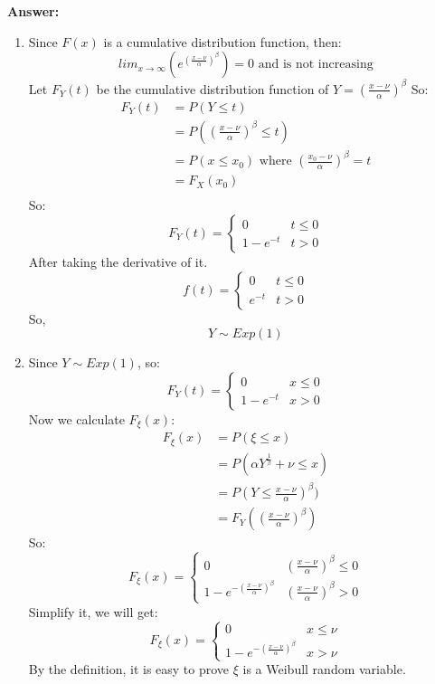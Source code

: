 \documentclass[hidelinks]{article}
\begin{document}
\textbf{Answer:}
\begin{enumerate}
    \item Since $F(x)$ is a cumulative distribution function, then:
    $$ lim_{x \rightarrow \infty}(e^{(\frac{x - \nu}{\alpha})^{\beta}}) = 0 \text{ and }  \text{is not increasing}$$
    Let $F_Y(t)$ be the cumulative distribution function of $Y = {(\frac{x - \nu}{\alpha})^{\beta}}$
    So:
    \begin{align*}
        F_Y(t) &= P(Y \leq t)\\
               &= P({(\frac{x - \nu}{\alpha})^{\beta}} \leq t)\\
               &= P(x \leq x_0)  \text{ where } {(\frac{x_0 - \nu}{\alpha})^{\beta}} = t \\
               &= F_X(x_0) \\
    \end{align*}
    So:
    \[
    F_Y(t) = 
    \begin{cases}
        0 & t \leq 0 \\
        1 - e^{-t} & t > 0
    \end{cases}
    \]
    After taking the derivative of it.
    \[
    f(t) = 
    \begin{cases}
        0 & t \leq 0 \\
        e^{-t} & t > 0
    \end{cases}
    \]
    So, $$Y \sim Exp(1)$$
    \item Since $Y \sim Exp(1)$, so:
    \[
    F_Y(t) = 
    \begin{cases}
        0 & x \leq 0 \\
        1 - e^{-t} & x > 0
    \end{cases}
    \]
    Now we calculate $F_\xi(x)$:
    \begin{align*}
        F_{\xi}(x) &= P(\xi \leq x) \\
                   &= P(\alpha Y^{\frac{1}{\beta}} + \nu \leq x) \\
                   &= P(Y \leq \frac{x - \nu}{\alpha})^{\beta}) \\
                   &= F_Y((\frac{x - \nu}{\alpha})^{\beta})
    \end{align*}    
    So:
    \[
    F_{\xi}(x) = 
    \begin{cases}
    0 & (\frac{x - \nu}{\alpha})^{\beta} \leq 0 \\
    1 - e^{-(\frac{x - \nu}{\alpha})^{\beta}} & (\frac{x - \nu}{\alpha})^{\beta} > 0
    \end{cases}
    \]
    Simplify it, we will get:
    \[
    F_{\xi}(x) = 
    \begin{cases}
    0 & x \leq \nu \\
    1 - e^{-(\frac{x - \nu}{\alpha})^{\beta}} & x > \nu
    \end{cases}
    \]
    By the definition, it is easy to prove $\xi$ is a Weibull random variable.
\end{enumerate}
\end{document}

